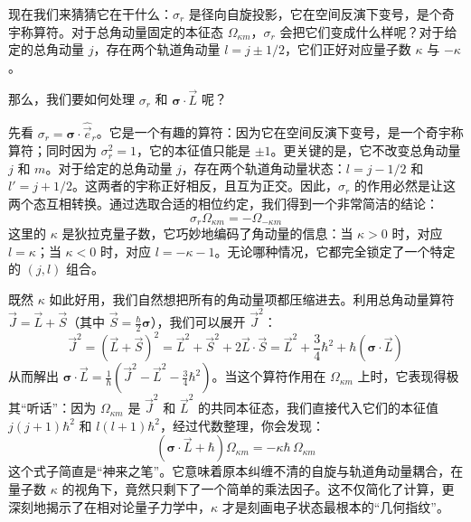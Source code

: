 \documentclass[UTF8]{ctexbook}
\begin{document}
现在我们来猜猜它在干什么：$\sigma_r$ 是径向自旋投影，它在空间反演下变号，是个奇宇称算符。对于总角动量固定的本征态 $\Omega_{\kappa m}$，$\sigma_r$ 会把它们变成什么样呢？对于给定的总角动量 $j$，存在两个轨道角动量 $l = j \pm 1/2$，它们正好对应量子数 $\kappa$ 与 $-\kappa$。

那么，我们要如何处理 $\sigma_r$ 和 $\boldsymbol{\sigma}\cdot\vec{L}$ 呢？

先看 $\sigma_r = \boldsymbol{\sigma}\cdot \hat{\vec{e}}_r$。它是一个有趣的算符：因为它在空间反演下变号，是一个奇宇称算符；同时因为 $\sigma_r^2 = 1$，它的本征值只能是 $\pm 1$。更关键的是，它不改变总角动量 $j$ 和 $m$。对于给定的总角动量 $j$，存在两个轨道角动量状态：$l = j - 1/2$ 和 $l' = j + 1/2$。这两者的宇称正好相反，且互为正交。因此，$\sigma_r$ 的作用必然是让这两个态互相转换。通过选取合适的相位约定，我们得到一个非常简洁的结论：
\[
\sigma_r \Omega_{\kappa m} = -\Omega_{-\kappa m}
\]
这里的 $\kappa$ 是狄拉克量子数，它巧妙地编码了角动量的信息：当 $\kappa > 0$ 时，对应 $l = \kappa$；当 $\kappa < 0$ 时，对应 $l = -\kappa - 1$。无论哪种情况，它都完全锁定了一个特定的 $(j, l)$ 组合。

既然 $\kappa$ 如此好用，我们自然想把所有的角动量项都压缩进去。利用总角动量算符 $\vec{J} = \vec{L} + \vec{S}$（其中 $\vec{S} = \frac{\hbar}{2}\boldsymbol{\sigma}$），我们可以展开 $\vec{J}^2$：
\[
\vec{J}^2 = (\vec{L} + \vec{S})^2 = \vec{L}^2 + \vec{S}^2 + 2\vec{L}\cdot\vec{S} = \vec{L}^2 + \frac{3}{4}\hbar^2 + \hbar(\boldsymbol{\sigma}\cdot\vec{L})
\]
从而解出 $\boldsymbol{\sigma}\cdot\vec{L} = \frac{1}{\hbar}(\vec{J}^2 - \vec{L}^2 - \frac{3}{4}\hbar^2)$。当这个算符作用在 $\Omega_{\kappa m}$ 上时，它表现得极其“听话”：因为 $\Omega_{\kappa m}$ 是 $\vec{J}^2$ 和 $\vec{L}^2$ 的共同本征态，我们直接代入它们的本征值 $j(j+1)\hbar^2$ 和 $l(l+1)\hbar^2$，经过代数整理，你会发现：
\[
(\boldsymbol{\sigma}\cdot \vec{L} + \hbar)\Omega_{\kappa m} = -\kappa\hbar\,\Omega_{\kappa m}
\]
这个式子简直是“神来之笔”。它意味着原本纠缠不清的自旋与轨道角动量耦合，在量子数 $\kappa$ 的视角下，竟然只剩下了一个简单的乘法因子。这不仅简化了计算，更深刻地揭示了在相对论量子力学中，$\kappa$ 才是刻画电子状态最根本的“几何指纹”。
\end{document}
